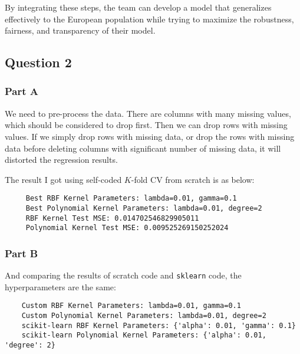 \documentclass[letterpaper]{article}
\begin{document}
		By integrating these steps, the team can develop a model that generalizes effectively to the European population while trying to maximize the robustness, fairness, and transparency of their model.
		
		
		
		\subsection{Question 2}
		
		
		\subsubsection{Part A}
		
		We need to pre-process the data. There are columns with many missing values, which should be considered to drop first. Then we can drop rows with missing values. If we simply drop rows with missing data, or drop the rows with missing data before deleting columns with significant number of missing data, it will distorted the regression results. 
		
		The result I got using self-coded $K$-fold CV from scratch is as below:
		
				\begin{minipage}{\linewidth}
			\begin{Verbatim}
     Best RBF Kernel Parameters: lambda=0.01, gamma=0.1
     Best Polynomial Kernel Parameters: lambda=0.01, degree=2
     RBF Kernel Test MSE: 0.014702546829905011
     Polynomial Kernel Test MSE: 0.009525269150252024
			\end{Verbatim}
	\end{minipage}


		\subsubsection{Part B}
		
		And comparing the results of scratch code and \texttt{sklearn} code, the hyperparameters are the same:
		
						\begin{minipage}{\linewidth}
			\begin{Verbatim}
    Custom RBF Kernel Parameters: lambda=0.01, gamma=0.1
    Custom Polynomial Kernel Parameters: lambda=0.01, degree=2
    scikit-learn RBF Kernel Parameters: {'alpha': 0.01, 'gamma': 0.1}
    scikit-learn Polynomial Kernel Parameters: {'alpha': 0.01, 'degree': 2}
			\end{Verbatim}
	\end{minipage}
\end{document}
